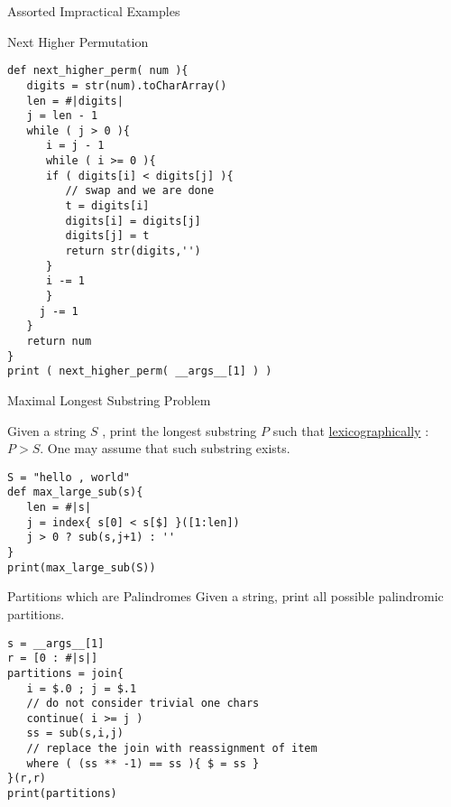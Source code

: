 \begin{section}{Assorted Impractical Examples}
\begin{subsection}{Next Higher Permutation}
\begin{center}\begin{minipage}{\linewidth}
\begin{lstlisting}[style=JexlStyle]
def next_higher_perm( num ){
   digits = str(num).toCharArray() 
   len = #|digits|
   j = len - 1 
   while ( j > 0 ){
      i = j - 1 
      while ( i >= 0 ){
      if ( digits[i] < digits[j] ){
         // swap and we are done 
         t = digits[i]
         digits[i] = digits[j]
         digits[j] = t 
         return str(digits,'') 
      }
      i -= 1 
      }
     j -= 1 
   }
   return num
}
print ( next_higher_perm( __args__[1] ) )
\end{lstlisting}  
\end{minipage}\end{center} 
\end{subsection}

\begin{subsection}{Maximal Longest Substring Problem}

Given a string $S$ , print the longest substring $P$ such that  
\href{https://en.wikipedia.org/wiki/Lexicographical\_order}{lexicographically} : $P > S$. 
One may assume that such substring exists.

\begin{center}\begin{minipage}{\linewidth}
\begin{lstlisting}[style=JexlStyle]
S = "hello , world"
def max_large_sub(s){
   len = #|s|
   j = index{ s[0] < s[$] }([1:len])
   j > 0 ? sub(s,j+1) : ''  
}
print(max_large_sub(S))
\end{lstlisting}  
\end{minipage}\end{center} 
\end{subsection}

\begin{subsection}{Partitions which are Palindromes}
Given a string, print all possible palindromic partitions.
\begin{center}\begin{minipage}{\linewidth}
\begin{lstlisting}[style=JexlStyle]
s = __args__[1]
r = [0 : #|s|]
partitions = join{
   i = $.0 ; j = $.1
   // do not consider trivial one chars
   continue( i >= j )
   ss = sub(s,i,j)
   // replace the join with reassignment of item 
   where ( (ss ** -1) == ss ){ $ = ss }
}(r,r)
print(partitions)
\end{lstlisting}  
\end{minipage}\end{center} 
\end{subsection}


\end{section}
